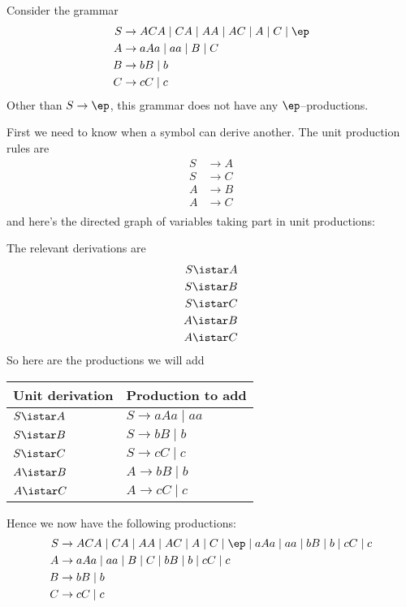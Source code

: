 \newpage
\begin{eg}
Consider the grammar
\begin{align*}
S &\rightarrow ACA \mid CA \mid AA \mid AC \mid A \mid C \mid \ep \\
A &\rightarrow aAa \mid aa \mid B \mid C \\
B &\rightarrow bB \mid b \\
C &\rightarrow cC \mid c
\end{align*}
Other than $S \rightarrow \ep$, this grammar does not have any 
$\ep$--productions.
\end{eg}

First we need to know when a symbol can derive another.
The unit production rules are
\begin{align*}
S &\rightarrow A \\
S &\rightarrow C \\
A &\rightarrow B \\
A &\rightarrow C \\
\end{align*}
and here's the directed graph of variables taking part in unit productions: 

The relevant derivations are
\begin{align*}
S \istar A \\
S \istar B \\
S \istar C \\
A \istar B \\
A \istar C
\end{align*}
So here are the productions we will add
\begin{center}
\begin{tabular}{|l|l|} \hline
Unit derivation & Production to add \\ \hline
$S \istar A$    & $S \rightarrow aAa \mid aa$ \\ \hline
$S \istar B$    & $S \rightarrow bB \mid b$ \\ \hline
$S \istar C$    & $S \rightarrow cC \mid c$ \\ \hline
$A \istar B$    & $A \rightarrow bB \mid b$ \\ \hline
$A \istar C$    & $A \rightarrow cC \mid c$ \\ \hline
\end{tabular}
\end{center}
Hence we now have the following productions:
\begin{align*}
S &\rightarrow ACA \mid CA \mid AA \mid AC \mid A \mid C \mid \ep \mid aAa \mid aa \mid
  bB \mid b \mid cC \mid c \\
A &\rightarrow aAa \mid aa \mid B \mid C \mid bB \mid b \mid cC \mid c \\
B &\rightarrow bB \mid b \\
C &\rightarrow cC \mid c  
\end{align*}

